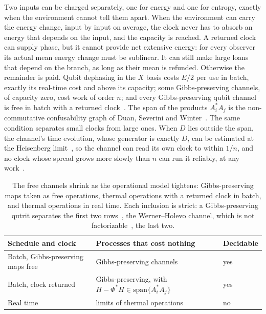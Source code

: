 \documentclass[11pt]{article}
\theoremstyle{definition}
\theoremstyle{remark}
\begin{document}
Two inputs can be charged separately, one for energy and one for entropy, exactly when the environment cannot tell them apart. When the environment can carry the energy change, input by input on average, the clock never has to absorb an energy that depends on the input, and the capacity is reached. A returned clock can supply phase, but it cannot provide net extensive energy: for every observer its actual mean energy change must be sublinear. It can still make large loans that depend on the branch, as long as their mean is refunded. Otherwise the remainder is paid. Qubit dephasing in the $X$ basis costs $E/2$ per use in batch, exactly its real-time cost and above its capacity; some Gibbs-preserving channels, of capacity zero, cost work of order $n$; and every Gibbs-preserving qubit channel is free in batch with a returned clock~\cite{KeepingTime}. The span of the products $A_i^*A_j$ is the non-commutative confusability graph of Duan, Severini and Winter~\cite{DSW13}. The same condition separates small clocks from large ones. When $D$ lies outside the span, the channel's time evolution, whose generator is exactly $D$, can be estimated at the Heisenberg limit~\cite{ZhouJiang21}, so the channel can read its own clock to within $1/n$, and no clock whose spread grows more slowly than $n$ can run it reliably, at any work~\cite{KeepingTime}.

\begin{table}[tbp]
\centering
\small
\begin{tabular}{>{\raggedright\arraybackslash}p{4.6cm}>{\raggedright\arraybackslash}p{6.6cm}l}
\toprule
Schedule and clock & Processes that cost nothing & Decidable\\
\midrule
Batch, Gibbs-preserving maps free~\cite{FBB21} & Gibbs-preserving channels & yes\\
Batch, clock returned & Gibbs-preserving, with $H-\Phi^*H\in\mathrm{span}\{A_i^*A_j\}$ & yes\\
Real time & limits of thermal operations~\cite{SaveWork} & no\\
\bottomrule
\end{tabular}
\caption{The free channels shrink as the operational model tightens: Gibbs-preserving maps taken as free operations, thermal operations with a returned clock in batch, and thermal operations in real time. Each inclusion is strict: a Gibbs-preserving qutrit separates the first two rows~\cite{KeepingTime}, the Werner--Holevo channel, which is not factorizable~\cite{HaagerupMusat11}, the last two.}\label{tab:ladder}
\end{table}
\end{document}
